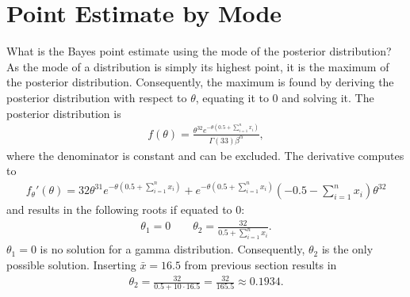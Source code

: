 \section{Point Estimate by Mode}
What is the Bayes point estimate using the mode of the posterior distribution?\\
As the mode of a distribution is simply its highest point, it is the maximum of the posterior distribution. Consequently, the maximum is found by deriving the posterior distribution with respect to $\theta$, equating it to 0 and solving it. The posterior distribution is
\begin{equation}
\begin{split}
f(\theta) = \frac{\theta^{32}e^{-\theta(0.5+\sum_{i=1}^n x_i)}}
{\Gamma(33)\beta^\alpha},
\end{split}
\label{eq:postdistinserted}
\end{equation}
where the denominator is constant and can be excluded. The derivative computes to
\begin{equation}
\begin{split}
f_\theta'(\theta) = 32\theta^{31}e^{-\theta\left(0.5+\sum_{i=1}^n x_i\right)}+e^{-\theta\left(0.5+\sum_{i=1}^n x_i\right)}\left(-0.5-\sum_{i=1}^n x_i\right)\theta^{32}
\end{split}
\label{eq:postdistderived}
\end{equation}
and results in the following roots if equated to 0:
\begin{equation}
\begin{split}
\theta_1 = 0 \qquad \theta_2 = \frac{32}{0.5+\sum_{i=1}^n x_i}.
\end{split}
\label{eq:roots}
\end{equation}
$\theta_1 = 0$ is no solution for a gamma distribution. Consequently, $\theta_2$ is the only possible solution. Inserting $\bar{x} = 16.5$ from previous section results in 
\begin{equation}
\begin{split}
\theta_2 = \frac{32}{0.5+10\cdot16.5} = \frac{32}{165.5} \approx 0.1934.
\end{split}
\label{eq:rootsN}
\end{equation}
